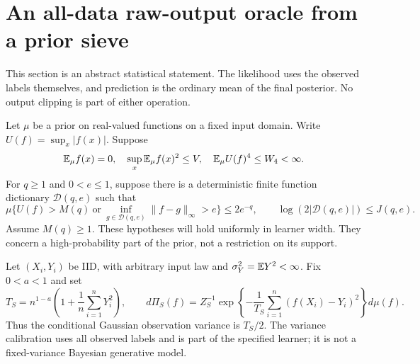 \section{An all-data raw-output oracle from a prior sieve}
\label{sec:raw-sieve-transfer}
This section is an abstract statistical statement. The likelihood uses
the observed labels themselves, and prediction is the ordinary mean of
the final posterior. No output clipping is part of either operation.

Let $\mu$ be a prior on real-valued functions on a fixed input domain.
Write $U(f)=\sup_x|f(x)|$. Suppose
\begin{equation}
 \mathbb E_\mu f(x)=0,\quad \sup_x\mathbb E_\mu f(x)^2\le V,
 \quad \mathbb E_\mu U(f)^4\le W_4<\infty.
 \label{eq:abstract-prior-moments}
\end{equation}
For $q\ge1$ and $0<e\le1$, suppose there is a deterministic finite
function dictionary $\mathcal D(q,e)$ such that
\begin{equation}
 \mu\{U(f)>M(q)\ \text{or}\
       \inf_{g\in\mathcal D(q,e)}\|f-g\|_\infty>e\}
       \le2e^{-q},
 \qquad \log(2|\mathcal D(q,e)|)\le J(q,e).
 \label{eq:abstract-sieve}
\end{equation}
Assume $M(q)\ge1$. These hypotheses will hold uniformly in learner width. They concern a
high-probability part of the prior, not a restriction on its support.

Let $(X_i,Y_i)$ be IID, with arbitrary input law and
$\sigma_Y^2=\mathbb E Y^2<\infty$. Fix $0<a<1$ and set
\begin{equation}
 T_S=n^{1-a}\left(1+\frac1n\sum_{i=1}^nY_i^2\right),\qquad
 d\Pi_S(f)=Z_S^{-1}
  \exp\left\{-\frac1{T_S}\sum_{i=1}^n(f(X_i)-Y_i)^2\right\}d\mu(f).
 \label{eq:raw-adaptive-temperature}
\end{equation}
Thus the conditional Gaussian observation variance is $T_S/2$.
The variance calibration uses all observed labels and is part of the
specified learner; it is not a fixed-variance Bayesian generative model.

